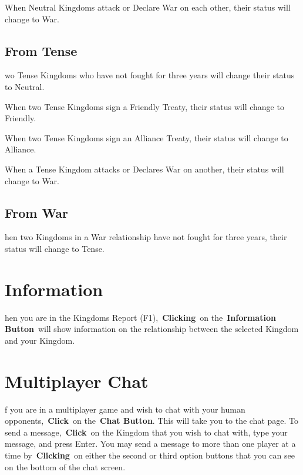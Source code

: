 When Neutral Kingdoms attack or Declare War on each other, their status will change to War.

\subsection{From Tense}

wo Tense Kingdoms who have not fought for three years will change their status to Neutral.

When two Tense Kingdoms sign a Friendly Treaty, their status will change to Friendly.

When two Tense Kingdoms sign an Alliance Treaty, their status will change to Alliance.

When a Tense Kingdom attacks or Declares War on another, their status will change to War.

\subsection{From War}

hen two Kingdoms in a War relationship have not fought for three years, their status will change to Tense.

\section{Information}

hen you are in the Kingdoms Report (F1), \textbf{Clicking} on the \textbf{Information Button} will show information on the relationship between the selected Kingdom and your Kingdom.

\section{Multiplayer Chat}


f you are in a multiplayer game and wish to chat with your human opponents, \textbf{Click} on the \textbf{Chat Button}. This will take you to the chat page. To send a message, \textbf{Click} on the Kingdom that you wish to chat with, type your message, and press Enter. You may send a message to more than one player at a time by \textbf{Clicking} on either the second or third option buttons that you can see on the bottom of the chat screen.

